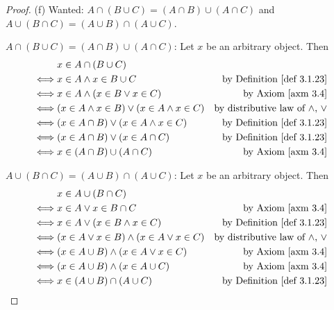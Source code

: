 \begin{proof}{(f)} Wanted: \(A \cap (B \cup C) = (A \cap B) \cup (A \cap C)\) and \(A \cup (B \cap C) = (A \cup B) \cap (A \cup C)\).

\(A \cap (B \cup C) = (A \cap B) \cup (A \cap C)\): Let \(x\) be an arbitrary object. Then
\begin{align*}
         & x \in A \cap (B \cup C) \\
    \iff & x \in A \land x \in B \cup C & \text{by \DEF{3.1.23}} \\
    \iff & x \in A \land (x \in B \lor x \in C) & \text{by \AXM{3.4}} \\
    \iff & (x \in A \land x \in B) \lor (x \in A \land x \in C) & \text{by distributive law of \(\land\), \(\lor\)} \\
    \iff & (x \in A \cap B) \lor (x \in A \land x \in C) & \text{by \DEF{3.1.23}} \\
    \iff & (x \in A \cap B) \lor (x \in A \cap C) & \text{by \DEF{3.1.23}} \\
    \iff & x \in (A \cap B) \cup (A \cap C) & \text{by \AXM{3.4}}
\end{align*}

\(A \cup (B \cap C) = (A \cup B) \cap (A \cup C)\): Let \(x\) be an arbitrary object. Then
\begin{align*}
         & x \in A \cup (B \cap C) \\
    \iff & x \in A \lor x \in B \cap C & \text{by \AXM{3.4}} \\
    \iff & x \in A \lor (x \in B \land x \in C) & \text{by \DEF{3.1.23}} \\
    \iff & (x \in A \lor x \in B) \land (x \in A \lor x \in C) & \text{by distributive law of \(\land\), \(\lor\)} \\
    \iff & (x \in A \cup B) \land (x \in A \lor x \in C) & \text{by \AXM{3.4}} \\
    \iff & (x \in A \cup B) \land (x \in A \cup C) & \text{by \AXM{3.4}} \\
    \iff & x \in (A \cup B) \cap (A \cup C) & \text{by \DEF{3.1.23}}
\end{align*}

\end{proof}

